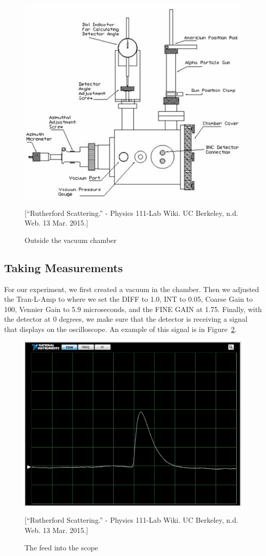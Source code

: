 \begin{figure}[h]
  \includegraphics[width = 5 cm]{Diagram2.jpg}
  \begin{center}
  \caption{Outside the vacuum chamber}[\footnotesize{``Rutherford Scattering.'' - Physics 111-Lab Wiki. UC Berkeley, n.d. Web. 13 Mar. 2015.}]
  \label{OutsideDiagram}
  \end{center}
\end{figure}

\subsection{Taking Measurements}

For our experiment, we first created a vacuum in the chamber. Then we adjusted the Tran-L-Amp to where we set the DIFF to 1.0, INT to 0.05, Coarse Gain to 100, Vennier Gain to  5.9 microseconds, and the FINE GAIN at 1.75. Finally, with the detector at 0 degrees, we make sure that the detector is receiving a signal that displays on the oscilloscope. An example of this signal is in Figure~\ref{Scope}.

\begin{figure}[h]
  \includegraphics[width = 3 cm]{Scope.png}
  \begin{center}
  \caption{The feed into the scope}[\footnotesize{``Rutherford Scattering.'' - Physics 111-Lab Wiki. UC Berkeley, n.d. Web. 13 Mar. 2015.}]
  \label{Scope}
  \end{center}
\end{figure}

\clearpage

